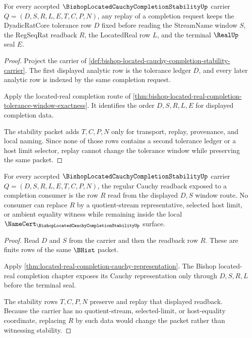 \begin{theorem}
\label{thm:bishop-located-cauchy-completion-tolerance-window-stability}
For every accepted $\BishopLocatedCauchyCompletionStabilityUp$ carrier $Q=(D,S,R,L,E,T,C,P,N)$, any replay of a completion request keeps the DyadicRatCore tolerance row $D$ fixed before reading the StreamName window $S$, the RegSeqRat readback $R$, the LocatedReal row $L$, and the terminal $\RealUp$ seal $E$.
\end{theorem}
\begin{proof}
Project the carrier of \autoref{def:bishop-located-cauchy-completion-stability-carrier}. The first displayed analytic row is the tolerance ledger $D$, and every later analytic row is indexed by the same completion request.

Apply the located-real completion route of \autoref{thm:bishop-located-real-completion-tolerance-window-exactness}. It identifies the order $D,S,R,L,E$ for displayed completion data.

The stability packet adds $T,C,P,N$ only for transport, replay, provenance, and local naming. Since none of those rows contains a second tolerance ledger or a host limit selector, replay cannot change the tolerance window while preserving the same packet.
\end{proof}

\begin{theorem}
\label{thm:bishop-located-cauchy-completion-readback-stability}
For every accepted $\BishopLocatedCauchyCompletionStabilityUp$ carrier $Q=(D,S,R,L,E,T,C,P,N)$, the regular Cauchy readback exposed to a completion consumer is the row $R$ read from the displayed $D,S$ window route. No consumer can replace $R$ by a quotient-stream representative, selected host limit, or ambient equality witness while remaining inside the local $\NameCert_{\BishopLocatedCauchyCompletionStabilityUp}$ surface.
\end{theorem}
\begin{proof}
Read $D$ and $S$ from the carrier and then the readback row $R$. These are finite rows of the same $\BHist$ packet.

Apply \autoref{thm:located-real-completion-cauchy-representation}. The Bishop located-real completion chapter exposes its Cauchy representation only through $D,S,R,L$ before the terminal seal.

The stability rows $T,C,P,N$ preserve and replay that displayed readback. Because the carrier has no quotient-stream, selected-limit, or host-equality coordinate, replacing $R$ by such data would change the packet rather than witnessing stability.
\end{proof}


